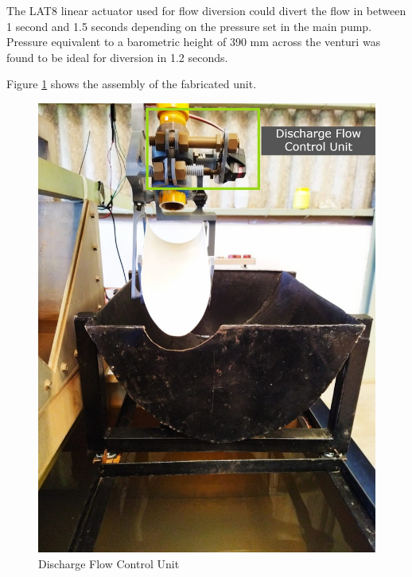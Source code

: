 \par
The LAT8 linear actuator used for flow diversion could divert the flow in between 1 second and 1.5 seconds depending on the pressure set in the main pump. Pressure equivalent to a barometric height of 390 mm across the venturi was found to be ideal for diversion in 1.2 seconds.
\par
Figure \ref{fig:Discharge Flow Control Unit} shows the assembly of the fabricated unit. 
\begin{figure}[H]
\centering
\includegraphics[width=.55\textwidth]{Figures/flow control Results.jpg}
\caption{Discharge Flow Control Unit}
\label{fig:Discharge Flow Control Unit}
\end{figure}
